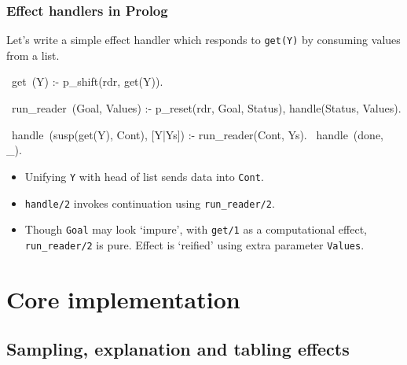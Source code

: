 \documentclass[usenames,dvipsnames]{beamer}
\newenvironment{fframe}[1][untitled]{\begin{frame}[fragile,environment=fframe]\frametitle{{#1}}}{\end{frame}}
\def\pl#1{\lstinline[language={[SWI]Prolog},columns=fullflexible]{#1}}
\begin{document}
\begin{fframe}[Effect handlers in Prolog]
Let's write a simple effect handler which responds to \pl{get(Y)} by consuming values from a list.
\begin{prolog}[frame=lines,belowskip=0em,xleftmargin=0em,basicstyle=\small]
  ~get~(Y) :- p_shift(rdr, get(Y)).

  ~run_reader~(Goal, Values) :- 
    p_reset(rdr, Goal, Status), handle(Status, Values).

  ~handle~(susp(get(Y), Cont), [Y|Ys]) :- run_reader(Cont, Ys).
  ~handle~(done, _).
\end{prolog}
\begin{itemize}
  \item<2-> Unifying \pl{Y} with head of list sends data into \pl{Cont}.
  \item<3-> \pl{handle/2} invokes continuation using \pl{run_reader/2}.
  \item<4-> Though \pl{Goal} may look `impure', with \pl{get/1} as a computational effect, 
  \pl{run_reader/2} is pure. Effect is `reified' using extra parameter \pl{Values}.
\end{itemize}
\end{fframe}


\section{Core implementation}

\subsection{Sampling, explanation and tabling effects}
\end{document}
